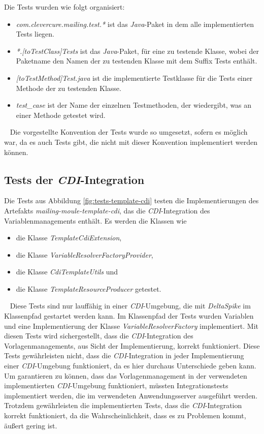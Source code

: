 \newline
\newline
Die Tests wurden wie folgt organisiert:
\begin{itemize}
	\item\emph{com.clevercure.mailing.test.*} 
	\newline
	ist das \emph{Java}-Paket in dem alle implementierten Tests liegen. 
	\item\emph{*.[toTestClass]Tests}
	\newline
	ist das \emph{Java}-Paket, für eine zu testende Klasse, wobei der Paketname den Namen der zu testenden Klasse mit dem Suffix Tests enthält.
	\item\emph{[toTestMethod]Test.java}
	\newline
	ist die implementierte Testklasse für die Tests einer Methode der zu testenden Klasse.
	\item\emph{test\_case}
	\newline
	ist der Name der einzelnen Testmethoden, der wiedergibt, was an einer Methode getestet wird. 
\end{itemize}
\ \newline
Die vorgestellte Konvention der Tests wurde so umgesetzt, sofern es möglich war, da es auch Tests gibt, die nicht mit dieser Konvention implementiert werden können.

\subsection{Tests der \emph{CDI}-Integration}
Die Tests aus Abbildung \ref{fig:tests-template-cdi} testen die Implementierungen des Artefakts \emph{mailing-moule-template-cdi}, das die \emph{CDI}-Integration des Variablenmanagements enthält. Es werden die Klassen wie
\begin{itemize}
	\item die Klasse \emph{TemplateCdiExtension},
	\item die Klasse \emph{VariableResolverFactoryProvider},
	\item die Klasse \emph{CdiTemplateUtils} und 
	\item die Klasse \emph{TemplateResourceProducer} getestet.
\end{itemize}
\ \newline
Diese Tests sind nur lauffähig in einer \emph{CDI}-Umgebung, die mit \emph{DeltaSpike} im Klassenpfad gestartet werden kann. Im Klassenpfad der Tests wurden Variablen und eine Implementierung der Klasse \emph{VariableResolverFactory} implementiert. Mit diesen Tests wird sichergestellt, dass die \emph{CDI}-Integration des Vorlagenmanagements, aus Sicht der Implementierung, korrekt funktioniert. Diese Tests gewährleisten nicht, dass die \emph{CDI}-Integration in jeder Implementierung einer \emph{CDI}-Umgebung funktioniert, da es hier durchaus Unterschiede geben kann. Um garantieren zu können, dass das Vorlagenmanagement in der verwendeten implementierten \emph{CDI}-Umgebung funktioniert, müssten Integrationstests implementiert werden, die im verwendeten Anwendungsserver ausgeführt werden. Trotzdem gewährleisten die implementierten Tests, dass die \emph{CDI}-Integration korrekt funktioniert, da die Wahrscheinlichkeit, dass es zu Problemen kommt, äußert gering ist.


